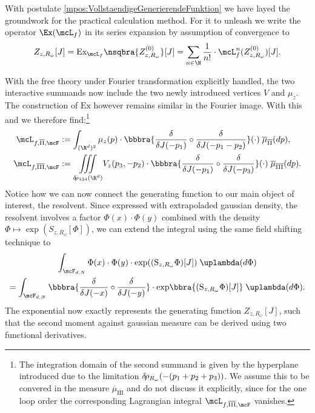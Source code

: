 With postulate \eqref{mpos:VollstaendigeGenerierendeFunktion} we have layed the groundwork for the practical calculation method. For it to unleash we write the operator $\Ex(\mcL_f)$ in its series expansion by assumption of convergence to 
\[
    Z_{z,R_\omega}[J] = \text{Ex}_{\mcL_f}\nsqbra{Z_{z,R_\omega}^{(0)}}[J] = \sum_{n\in\N} \frac{1}{n!}\cdot\mcL_f^n(Z_{z,R_\omega}^{(0)})[J].
\]


% 
With the free theory under Fourier transformation explicitly handled, the two interactive summands now include the two newly introduced vertices $V$ and $\mu_z$. 
The construction of $\text{Ex}$ however remains similar in the Fourier image. 
With this and \cite{mth:vogel} we therefore find:\footnote{The integration domain of the second summand is given by the hyperplane introduced due to the limitation $\delta\hspace*{-0.15em}\rho_{R_\omega}(-(p_1 + p_2 + p_3))$. We assume this to be convered in the measure $\overline\mu_{\overline{\text{III}}}$ and do not discuss it explicitly, since for the one loop order the corresponding Lagrangian integral $\mcL_{f,\overline{\text{III}},\mcF}$ vanishes.}
\begin{align*}
    \mcL_{f,\overline{\text{II}},\mcF} &:= \int_{(\R^d)^2}\mu_z(p)\cdot\bbbra{\frac{\delta}{\delta J(-p_1)}\circ\frac{\delta}{\delta J(-p_1-p_2)}}(\cdot)\;\overline\mu_{\overline{\text{II}}}(dp), \\
    \mcL_{f,\overline{\text{III}},\mcF} &:= \underset{\drho_{134}(\R^d)}{\iiint} V_z(p_3,-p_2)\cdot\bbbra{\frac{\delta}{\delta J(-p_1)}\circ \frac{\delta}{\delta J(-p_3)}}(\cdot)\;\overline\mu_{\overline{\text{III}}}(dp).
\end{align*}
Notice how we can now connect the generating function to our main object of interest, the resolvent. Since expressed with extrapoladed gaussian density, the resolvent involves a factor $\Phi(x)\cdot\Phi(y)$ combined with the density $\Phi\mapsto \exp(S_{z,R_\omega}[\Phi])$, we can extend the integral using the same field shifting technique to 
\begin{multline}
    \int_{\mcF_{d,N}}\Phi(x)\cdot\Phi(y)\cdot \exp((\text{S}_{z,R_\omega}\Phi)[J])\;\uplambda(d\Phi) \\
    = \int_{\mcF_{d,N}}\bbbra{\frac{\delta}{\delta J(-x)}\circ\frac{\delta}{\delta J(-y)}}\cdot{\exp}\bbra{(\text{S}_{z,R_\omega}\Phi)[J]}\;\uplambda(d\Phi).
    \label{eq:GeneratedSecondMomentIntegral}
\end{multline}
The exponential now exactly represents the generating function $Z_{z,R_\omega}[J]$, such that the second moment against gaussian measure can be derived using two functional derivatives.


